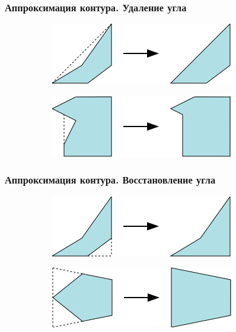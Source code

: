 \documentclass[10pt, unicode]{beamer}
\begin{document}
    \begin{frame}
        \frametitle{Аппроксимация контура. Удаление угла}
        \begin{figure}[H]
            \centering
            \begin{subfigure}[t]{\linewidth}
                \centering
                \includegraphics[scale=0.8]{images/earcut.png}
            \end{subfigure}
            \begin{subfigure}[b]{\linewidth}
                \centering
                \includegraphics[scale=0.8]{images/bendneighbor.png}
            \end{subfigure}
        \end{figure}
    \end{frame}
    \begin{frame}
        \frametitle{Аппроксимация контура. Восстановление угла}
        \begin{figure}[H]
            \begin{subfigure}[t]{\linewidth}
                \centering
                \includegraphics[scale=0.8]{images/bendneighbor2.png}
            \end{subfigure}
            \begin{subfigure}[t]{\linewidth}
                \centering
                \includegraphics[scale=0.8]{images/bendoutboth.png}
            \end{subfigure}
        \end{figure}
    \end{frame}
\end{document}
